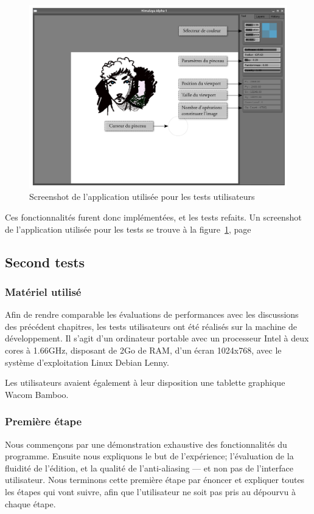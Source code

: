 		\begin{figure}[ht]
			\centering
			\includegraphics[width=\textwidth]{images/screenshot} 
			\caption{Screenshot de l'application utilisée pour les tests utilisateurs}
			\label{fig:screenshot}
		\end{figure}
		Ces fonctionnalités furent donc implémentées, et les tests refaits. Un screenshot de l'application
		utilisée pour les tests se trouve à la figure~\ref{fig:screenshot}, page~\pageref{fig:screenshot} 

		\subsection{Second tests}
			\subsubsection{Matériel utilisé}
			Afin de rendre comparable les évaluations de performances avec les discussions des
			précédent chapitres, les tests utilisateurs ont été réalisés sur la machine de développement.
			Il s'agit d'un ordinateur portable avec un processeur Intel à deux cores à 1.66GHz, disposant
			de 2Go de RAM, d'un écran 1024x768, avec le système d'exploitation Linux Debian Lenny.

			Les utilisateurs avaient également à leur disposition une tablette graphique Wacom Bamboo.

			\subsubsection{Première étape}
			Nous commençons par une démonstration exhaustive des fonctionnalités du programme.
			Ensuite nous expliquons le but de l'expérience; l'évaluation de la fluidité de
			l'édition, et la qualité de l'anti-aliasing --- et non pas de l'interface utilisateur.
			Nous terminons cette première étape par énoncer et expliquer toutes les étapes qui vont suivre,
			afin que l'utilisateur ne soit pas pris au dépourvu à chaque étape.

